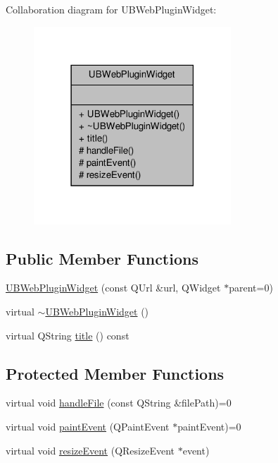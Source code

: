 Collaboration diagram for U\-B\-Web\-Plugin\-Widget\-:
\nopagebreak
\begin{figure}[H]
\begin{center}
\leavevmode
\includegraphics[width=210pt]{d3/df5/class_u_b_web_plugin_widget__coll__graph}
\end{center}
\end{figure}
\subsection*{Public Member Functions}
\begin{DoxyCompactItemize}
\item 
\hyperlink{class_u_b_web_plugin_widget_ada4887db461da595a0e783ed911bb59d}{U\-B\-Web\-Plugin\-Widget} (const Q\-Url \&url, Q\-Widget $\ast$parent=0)
\item 
virtual \hyperlink{class_u_b_web_plugin_widget_a282fe856f607677a15c835eb376c2dff}{$\sim$\-U\-B\-Web\-Plugin\-Widget} ()
\item 
virtual Q\-String \hyperlink{class_u_b_web_plugin_widget_a334e6fb6e6101fb959d715d545701db7}{title} () const 
\end{DoxyCompactItemize}
\subsection*{Protected Member Functions}
\begin{DoxyCompactItemize}
\item 
virtual void \hyperlink{class_u_b_web_plugin_widget_a199cabda58bc1a90f23a8a8ea0d17641}{handle\-File} (const Q\-String \&file\-Path)=0
\item 
virtual void \hyperlink{class_u_b_web_plugin_widget_abedbe5c9fcfd759a386a6f393188b955}{paint\-Event} (Q\-Paint\-Event $\ast$paint\-Event)=0
\item 
virtual void \hyperlink{class_u_b_web_plugin_widget_a33356b69bc403a58d3ac0a62f1a11481}{resize\-Event} (Q\-Resize\-Event $\ast$event)
\end{DoxyCompactItemize}


